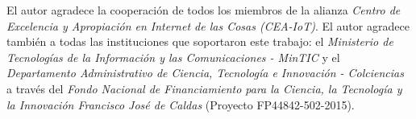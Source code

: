 \documentclass[11pt, openright]{Thesis}      %
\begin{document}
\pagestyle{fancy}  %

\tableofcontents  %

\listoffigures  %

\listoftables  %

\acknowledgements
{
El autor agradece la cooperación de todos los miembros de la alianza \textit{Centro de Excelencia y Apropiaci\'{o}n en Internet de las Cosas (CEA-IoT)}. El autor agradece también a todas las instituciones que soportaron este trabajo: el \textit{Ministerio de Tecnolog\'{i}as de la Informaci\'{o}n y las Comunicaciones - MinTIC} y el \textit{Departamento Administrativo de Ciencia, Tecnolog\'{i}a e Innovaci\'{o}n - Colciencias} a través del \textit{Fondo Nacional de Financiamiento para la Ciencia, la Tecnolog\'{i}a y la Innovaci\'{o}n Francisco Jos\'{e} de Caldas} (Proyecto FP44842-502-2015).
}
\end{document}
